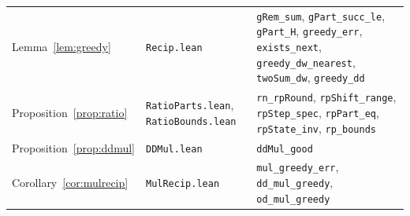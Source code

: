 \begin{table}[tp]
\begin{tabular}{@{}>{\raggedright\arraybackslash}p{3.3cm}>{\raggedright\arraybackslash}p{5.0cm}>{\raggedright\arraybackslash}p{8.6cm}@{}}
Lemma~\ref{lem:greedy} & \texttt{Recip.lean} & \texttt{gRem\_sum}, \texttt{gPart\_succ\_le}, \texttt{gPart\_H},
  \texttt{greedy\_err}, \texttt{exists\_next}, \texttt{greedy\_dw\_nearest}, \texttt{twoSum\_dw}, \texttt{greedy\_dd} \\
Proposition~\ref{prop:ratio} & \texttt{RatioParts.lean}, \texttt{RatioBounds.lean} & \texttt{rn\_rpRound},
  \texttt{rpShift\_range}, \texttt{rpStep\_spec}, \texttt{rpPart\_eq}, \texttt{rpState\_inv}, \texttt{rp\_bounds} \\
Proposition~\ref{prop:ddmul} & \texttt{DDMul.lean} & \texttt{ddMul\_good} \\
Corollary~\ref{cor:mulrecip} & \texttt{MulRecip.lean} & \texttt{mul\_greedy\_err}, \texttt{dd\_mul\_greedy},
  \texttt{od\_mul\_greedy} \\
\bottomrule
\end{tabular}
\end{table}

